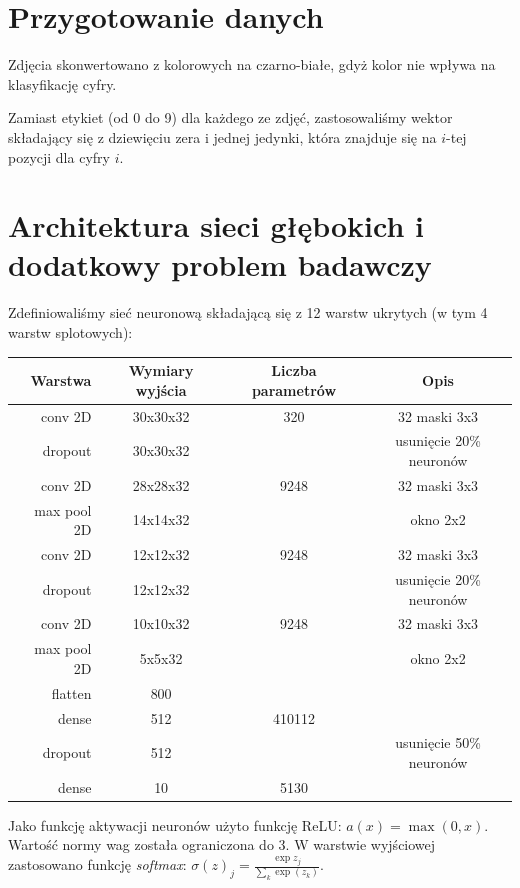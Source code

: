 \documentclass[12pt]{article}
\begin{document}
\section{Przygotowanie danych}

Zdjęcia skonwertowano z kolorowych na czarno-białe, gdyż kolor nie wpływa na klasyfikację cyfry.

Zamiast etykiet (od 0 do 9) dla każdego ze zdjęć, zastosowaliśmy wektor składający się z dziewięciu zera i jednej jedynki, która znajduje się na $i$-tej pozycji dla cyfry $i$.

\section{Architektura sieci głębokich i dodatkowy problem badawczy}

Zdefiniowaliśmy sieć neuronową składającą się z 12 warstw ukrytych (w tym 4 warstw splotowych):

\begin{tabular}{|r|c|c|c|}
  \hline 
  Warstwa & Wymiary wyjścia & Liczba parametrów & Opis\\
  \hline
  conv 2D & 30x30x32 & 320 & 32 maski 3x3\\
  \hline
  dropout & 30x30x32 &  & usunięcie 20\% neuronów \\
  \hline
  conv 2D & 28x28x32 & 9248 & 32 maski 3x3\\
  \hline
  max pool 2D & 14x14x32 &  & okno 2x2\\
  \hline
  conv 2D & 12x12x32 & 9248 & 32 maski 3x3\\
  \hline
  dropout & 12x12x32 &  & usunięcie 20\% neuronów \\
  \hline
  conv 2D & 10x10x32 & 9248 & 32 maski 3x3\\
  \hline
  max pool 2D & 5x5x32 &  & okno 2x2\\
  \hline
  flatten & 800 &  & \\
  \hline
  dense & 512 & 410112 & \\
  \hline
  dropout & 512 &  & usunięcie 50\% neuronów \\
  \hline
  dense & 10 & 5130 & \\
  \hline

\end{tabular} 

Jako funkcję aktywacji neuronów użyto funkcję ReLU: $a(x) = \max(0, x)$. Wartość normy wag została ograniczona do $3$. W warstwie wyjściowej zastosowano funkcję \textit{softmax}: $\sigma(z)_j=\frac{\exp{z_j}}{\sum_k \exp(z_k)}$.
\end{document}
